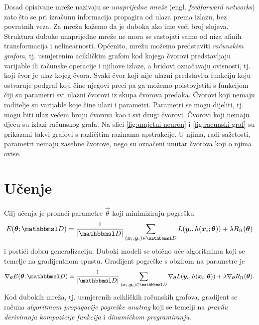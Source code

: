 \documentclass[utf8, diplomski, lmodern]{fer}
\begin{document}
Dosad opisivane mreže nazivaju se \emph{unaprijedne mreže} (engl. \textit{feedforward networks}) zato što se pri izračunu informacija propagira od ulaza prema izlazu, bez povratnih veza. Za mrežu kažemo da je duboka ako ime veći broj slojeva. Struktura duboke unaprijedne mreže ne mora se sastojati samo od niza afinih transformacija i nelinearnosti. Općenito, mrežu možemo predstaviti \emph{računskim grafom}, tj. usmjerenim acikličkim grafom kod kojega čvorovi predstavljaju varijable ili računske operacije i njihove izlaze, a bridovi označavaju ovisnosti, tj. koji čvor je ulaz kojeg čvora. Svaki čvor koji nije ulazni predstavlja funkciju koju ostvaruje podgraf koji čine njegovi preci pa ga možemo poistovjetiti s funkcijom čiji su parametri svi ulazni čvorovi iz skupa čvorova predaka. Čvorovi koji nemaju roditelje su varijable koje čine ulazi i parametri. Parametri se mogu dijeliti, tj. mogu biti ulaz većem broju čvorova kao i svi drugi čvorovi. Čvorovi koji nemaju djecu su izlazi računskog grafa. Na slici \ref{fig:umjetni-neuron} i \ref{fig:racunski-graf} su prikazani takvi grafovi s različitim razinama apstrakcije. U njima, radi sažetosti, parametri nemaju zasebne čvorove, nego su označeni unutar čvorova koji o njima ovise.

\section{Učenje} \label{sec:du-ucenje}

Cilj učenja je pronaći parametre $\vec\theta$ koji minimiziraju pogrešku
\begin{align}
E(\vec\theta;\set D) = \frac{1}{\envert{\set D}}\sum_{(\vec x_i,\vec y_i)\in\set D} L(\vec y_i,h(\vec x_i;\vec\theta)) + \lambda R_\text{R}(\vec\theta)
\end{align}
i postići dobru generalizaciju. Duboki modeli se obično uče algoritmima koji se temelje na gradijentnom spustu. Gradijent pogreške s obzirom na parametre je
\begin{align} \label{eq:gs-ucenje}
\nabla_{\vec\theta}E(\vec\theta;\set D) = \frac{1}{\envert{\set D}}\sum_{(\vec x_i,\vec y_i)\in\set D} \nabla_{\vec\theta}L(\vec y_i,h(\vec x_i;\vec\theta)) + \lambda \nabla_{\vec\theta}R_\text{R}(\vec\theta) \text{.}
\end{align}
Kod dubokih mreža, tj. usmjerenih acikličkih računskih grafova, gradijent se računa \emph{algoritmom propagacije pogreške unatrag} \citep{Rumelhart:1986:LIREP} koji se temelji na \emph{pravilu deriviranja kompozicije funkcija} i \emph{dinamičkom programiranju}. 
\end{document}
